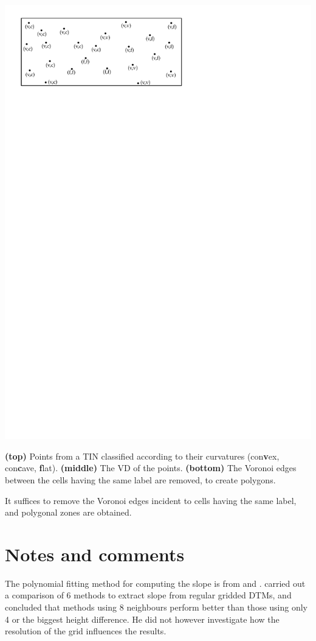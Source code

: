 \begin{marginfigure}
  \includegraphics[page=3,width=\linewidth]{figs/vd}
  \caption{\textbf{(top)} Points from a TIN classified according to their curvatures (con\textbf{v}ex, con\textbf{c}ave, \textbf{f}lat). \textbf{(middle)} The VD of the points. \textbf{(bottom)} The Voronoi edges between the cells having the same label are removed, to create polygons.}%
\label{fig:vd}
\end{marginfigure}
It suffices to remove the Voronoi edges incident to cells having the same label, and polygonal zones are obtained.




%
\section{Notes and comments}

The polynomial fitting method for computing the slope is from \citet{Evans80} and \citet{Wood96}.
\citet{Skidmore89} carried out a comparison of 6 methods to extract slope from regular gridded DTMs, and concluded that methods using 8 neighbours perform better than those using only 4 or the biggest height difference.
He did not however investigate how the resolution of the grid influences the results.

